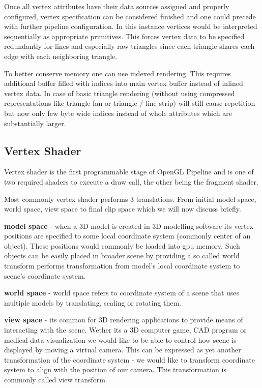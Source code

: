 Once all vertex attributes have their data sources assigned and properly configured, vertex specification can be considered finished and one could precede with further pipeline configuration.
In this instance vertices would be interpreted sequentially as appropriate primitives. This forces vertex data to be specified redundantly for lines and especially raw triangles since each triangle shares each edge with each neighboring triangle.

To better conserve memory one can use indexed rendering. This requires additional buffer filled with indices into main vertex buffer instead of inlined vertex data.
In case of basic triangle rendering (without using compressed representations like triangle fan or triangle / line strip) will still cause repetition but now only few byte wide indices instead of whole attributes which are substantially larger.

\subsection{Vertex Shader}

Vertex shader is the first programmable stage of OpenGL Pipeline and is one of two required shaders to execute a draw call, the other being the fragment shader.

Most commonly vertex shader performs 3 translations. From initial model space, world space, view space to final clip space which we will now discuss briefly.

\textbf{model space} - when a 3D model is created in 3D modelling software its vertex positions are specified to some local coordinate system (commonly center of an object).
These positions would commonly be loaded into gpu memory. Such objects can be easily placed in broader scene by providing a so called world transform performs transformation from model's local coordinate system
to scene's coordinate system.

\textbf{world space} - world space refers to coordinate system of a scene that uses multiple models by translating, scaling or rotating them.

\textbf{view space} - its common for 3D rendering applications to provide means of interacting with the scene. Wether its a 3D computer game, CAD program or medical data visualization we would like to be able to 
control how scene is displayed by moving a virtual camera. This can be expressed as yet another transformation of the coordinate system - we would like to transform coordinate system to align with the position of our camera.
This transformation is commonly called view transform.

